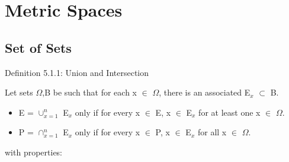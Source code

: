 \newpage
\section[Day 5: Metric Spaces and Set Types]{Metric Spaces}

\subsection{ Set of Sets } 

{ \color{blue} Definition 5.1.1: Union and Intersection } 

	\begin{adjustbox}{minipage=14cm, right}
		Let sets $\Omega$,B be such that for each x $\in$ $\Omega$,
		there is an associated E$_x$ $\subset$ B.
		\begin{itemize}[leftmargin=1cm, itemsep=0.4em]
			\item E = $\cup_{x=1}^{n}$ E$_x$ only if for every x $\in$ E, x $\in$ E$_x$ for
				at least one x $\in$ $\Omega$.

			\item P = $\cap_{x=1}^{n}$ E$_x$ only if for every x $\in$ P, x $\in$ E$_x$ for
				all x $\in$ $\Omega$.
		\end{itemize}
		with properties:
	\end{adjustbox}

